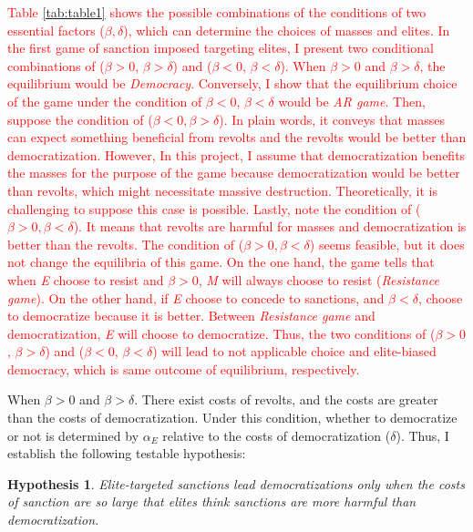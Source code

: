 \documentclass[11pt, letterpage]{article}
\newtheorem{hyp}{Hypothesis}
\begin{document}
\textcolor{red}{Table \ref{tab:table1} shows the possible combinations of the conditions of two essential factors ($\beta, \delta$), which can determine the choices of masses and elites. In the first game of sanction imposed targeting elites, I present two conditional combinations of ($\beta > 0$, $\beta > \delta$) and ($\beta < 0$, $\beta < \delta$). When $\beta > 0$ and $\beta > \delta$, the equilibrium would be \textit{Democracy}. Conversely, I show that the equilibrium choice of the game under the condition of $\beta < 0$, $\beta < \delta$ would be \textit{AR game}. Then, suppose the condition of ($\beta < 0, \beta > \delta$). In plain words, it conveys that masses can expect something beneficial from revolts and the revolts would be better than democratization. However, In this project, I assume that democratization benefits the masses for the purpose of the game because democratization would be better than revolts, which might necessitate massive destruction. Theoretically, it is challenging to suppose this case is possible. Lastly, note the condition of ($\beta > 0, \beta < \delta$). It means that revolts are harmful for masses and democratization is better than the revolts. The condition of ($\beta > 0, \beta < \delta$) seems feasible, but it does not change the equilibria of this game. On the one hand, the game tells that when \textit{E} choose to resist and $\beta>0$,  \textit{M} will always choose to resist (\textit{Resistance game}). On the other hand, if \textit{E} choose to concede to sanctions, and $\beta < \delta$,  choose to democratize because it is better. Between \textit{Resistance game} and democratization, \textit{E} will choose to democratize. Thus, the two conditions of ($\beta > 0$, $\beta > \delta$) and ($\beta < 0$, $\beta < \delta$) will lead to not applicable choice and elite-biased democracy, which is same outcome of equilibrium, respectively.}

When $\beta > 0$ and $\beta > \delta$. There exist costs of revolts, and the costs are greater than the costs of democratization. Under this condition, whether to democratize or not is determined by $\alpha_{E}$ relative to the costs of democratization ($\delta$). Thus, I establish the following testable hypothesis:
	
\begin{hyp}
	\label{hyp1}
	Elite-targeted sanctions lead democratizations only when the costs of sanction are so large that elites think sanctions are more harmful than democratization.
\end{hyp}
\end{document}

